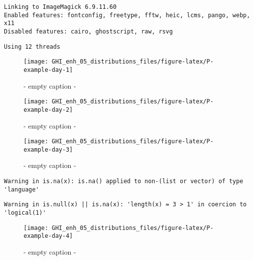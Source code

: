 \documentclass[
  10pt,
  a4paper,oneside]{article}
\begin{document}
\begin{verbatim}
Linking to ImageMagick 6.9.11.60
Enabled features: fontconfig, freetype, fftw, heic, lcms, pango, webp, x11
Disabled features: cairo, ghostscript, raw, rsvg
\end{verbatim}

\begin{verbatim}
Using 12 threads
\end{verbatim}

\begin{figure}[H]

{\centering \texttt{[image: GHI\_enh\_05\_distributions\_files/figure-latex/P-example-day-1]} 

}

\caption{ - empty caption - }\label{fig:P-example-day-1}
\end{figure}
\begin{figure}[H]

{\centering \texttt{[image: GHI\_enh\_05\_distributions\_files/figure-latex/P-example-day-2]} 

}

\caption{ - empty caption - }\label{fig:P-example-day-2}
\end{figure}
\begin{figure}[H]

{\centering \texttt{[image: GHI\_enh\_05\_distributions\_files/figure-latex/P-example-day-3]} 

}

\caption{ - empty caption - }\label{fig:P-example-day-3}
\end{figure}

\begin{verbatim}
Warning in is.na(x): is.na() applied to non-(list or vector) of type 'language'
\end{verbatim}

\begin{verbatim}
Warning in is.null(x) || is.na(x): 'length(x) = 3 > 1' in coercion to
'logical(1)'
\end{verbatim}

\begin{figure}[H]

{\centering \texttt{[image: GHI\_enh\_05\_distributions\_files/figure-latex/P-example-day-4]} 

}

\caption{ - empty caption - }\label{fig:P-example-day-4}
\end{figure}
\end{document}
